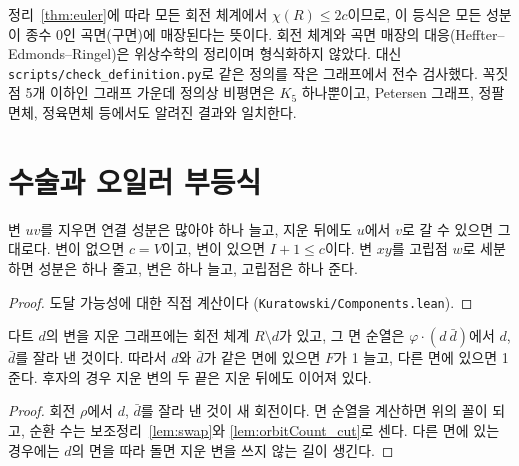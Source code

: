 정리~\ref{thm:euler}에 따라 모든 회전 체계에서 \(\chi(R) \le 2c\)이므로, 이 등식은 모든 성분이 종수
0인 곡면(구면)에 매장된다는 뜻이다. 회전 체계와 곡면 매장의 대응(Heffter--Edmonds--Ringel)은
위상수학의 정리이며 형식화하지 않았다. 대신 \texttt{scripts/check\_definition.py}로 같은 정의를
작은 그래프에서 전수 검사했다. 꼭짓점 5개 이하인 그래프 가운데 정의상 비평면은 \(K_5\) 하나뿐이고,
Petersen 그래프, 정팔면체, 정육면체 등에서도 알려진 결과와 일치한다.

\section{수술과 오일러 부등식}

\begin{lemma}[연결 성분, 변, 고립점 세기]
\label{lem:components}
\leanok
{}
변 \(uv\)를 지우면 연결 성분은 많아야 하나 늘고, 지운 뒤에도 \(u\)에서 \(v\)로 갈 수 있으면 그대로다.
변이 없으면 \(c = V\)이고, 변이 있으면 \(I + 1 \le c\)이다. 변 \(xy\)를 고립점 \(w\)로 세분하면 성분은 하나 줄고, 변은
하나 늘고, 고립점은 하나 준다.
\end{lemma}

\begin{proof}
\leanok
도달 가능성에 대한 직접 계산이다 (\texttt{Kuratowski/Components.lean}).
\end{proof}

\begin{theorem}[변 지우기]
\label{thm:del}
\leanok
{}
다트 \(d\)의 변을 지운 그래프에는 회전 체계 \(R \setminus d\)가 있고, 그 면 순열은
\(\varphi \cdot (d\ \bar d)\)에서 \(d\), \(\bar d\)를 잘라 낸 것이다. 따라서 \(d\)와 \(\bar d\)가 같은 면에
있으면 \(F\)가 1 늘고, 다른 면에 있으면 1 준다. 후자의 경우 지운 변의 두 끝은 지운 뒤에도 이어져 있다.
\end{theorem}

\begin{proof}
\leanok
{}
회전 \(\rho\)에서 \(d\), \(\bar d\)를 잘라 낸 것이 새 회전이다. 면 순열을 계산하면 위의 꼴이 되고,
순환 수는 보조정리~\ref{lem:swap}와 \ref{lem:orbitCount_cut}로 센다. 다른 면에 있는 경우에는 \(d\)의 면을 따라
돌면 지운 변을 쓰지 않는 길이 생긴다.
\end{proof}

